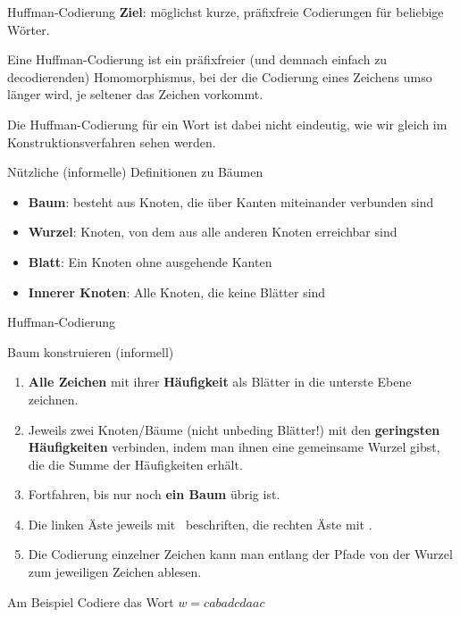 \begin{frame}{Huffman-Codierung}
	\textbf{Ziel}: möglichst kurze, präfixfreie Codierungen für beliebige Wörter.
	\pause
	\begin{exampleblock}{}
		Eine Huffman-Codierung ist ein präfixfreier (und demnach einfach zu decodierenden) Homomorphismus, bei der die Codierung eines Zeichens umso länger wird, je seltener das Zeichen vorkommt.
	
		Die Huffman-Codierung für ein Wort ist dabei nicht eindeutig, wie wir gleich im Konstruktionsverfahren sehen werden.
	\end{exampleblock}
\end{frame}
\begin{frame}
	\begin{block}{Nützliche (informelle) Definitionen zu Bäumen}
		\begin{itemize}
			\item \textbf{Baum}: besteht aus Knoten, die über Kanten miteinander verbunden sind
			\item \textbf{Wurzel}: Knoten, von dem aus alle anderen Knoten erreichbar sind
			\item \textbf{Blatt}: Ein Knoten ohne ausgehende Kanten
			\item \textbf{Innerer Knoten}: Alle Knoten, die keine Blätter sind
		\end{itemize}
	\end{block}
\end{frame}

\begin{frame}{Huffman-Codierung}
	\begin{block}{Baum konstruieren (informell)}
		\begin{enumerate}
			\item \textbf{Alle Zeichen} mit ihrer \textbf{Häufigkeit} als Blätter in die unterste Ebene zeichnen.
			\item Jeweils zwei Knoten/Bäume (nicht unbeding Blätter!) mit den \textbf{geringsten Häufigkeiten} verbinden, indem man ihnen eine gemeinsame Wurzel gibst, die die Summe der Häufigkeiten erhält.
			\item Fortfahren, bis nur noch \textbf{ein Baum} übrig ist.
			\item Die linken Äste jeweils mit \bzero \ beschriften, die rechten Äste mit \bone.
			\item Die Codierung einzelner Zeichen kann man entlang der Pfade von der Wurzel zum jeweiligen Zeichen ablesen.
		\end{enumerate}
	\end{block}
	\begin{exampleblock}{Am Beispiel}
		Codiere das Wort $w= cabadcdaac $
	\end{exampleblock}
\end{frame}

